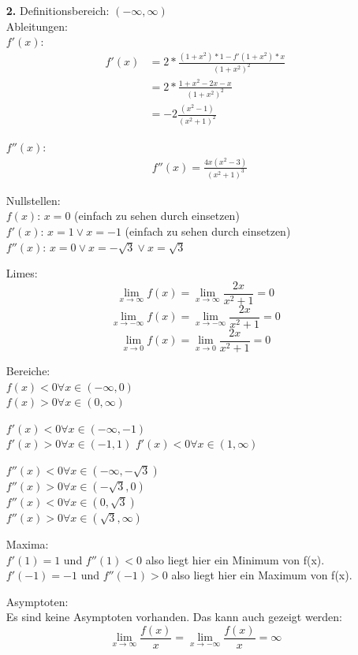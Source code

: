 \documentclass[a4paper]{scrartcl}
\begin{document}
\begin{enumerate}
\item[\textbf{2.}]
Definitionsbereich: \((-\infty,\infty)\)\\
Ableitungen:\\

\(f'(x)\):
\begin{align}
f'(x)&=2*\frac {(1+x^2)*1-f'(1+x^2)*x} {(1+x^2)^2}\\
&=2*\frac {1+x^2-2x-x} {(1+x^2)^2}\\
&=-2\frac {(x^2-1)} {(x^2+1)^2}
\end{align}

\(f''(x)\):
\begin{align}
&f''(x)=\frac {4x(x^2-3)} {(x^2+1)^3}
\end{align}

Nullstellen:\\
\(f(x)\): \(x = 0\) (einfach zu sehen durch einsetzen)\\
\(f'(x)\): \(x = 1 \vee x = -1\) (einfach zu sehen durch einsetzen)\\
\(f''(x)\): \(x = 0 \vee x = -\sqrt 3 \vee x = \sqrt 3\)

Limes:\\
\[\lim_{x \to \infty} f(x) = \lim_{x \to \infty} \frac {2x} {x^2+1} = 0\]
\[\lim_{x \to -\infty} f(x) = \lim_{x \to -\infty} \frac {2x} {x^2+1} = 0\]
\[\lim_{x \to 0} f(x) = \lim_{x \to 0} \frac {2x} {x^2+1} = 0\]

Bereiche:\\
\(f(x) < 0 \forall x \in (-\infty,0)\)\\
\(f(x) > 0 \forall x \in (0,\infty)\)

\(f'(x) < 0 \forall x \in (-\infty,-1)\)\\
\(f'(x) > 0 \forall x \in (-1,1)\)
\(f'(x) < 0 \forall x \in (1,\infty)\)


\(f''(x) < 0 \forall x \in (-\infty,-\sqrt 3)\)\\
\(f''(x) > 0 \forall x \in (-\sqrt 3,0)\)\\
\(f''(x) < 0 \forall x \in (0, \sqrt 3)\)\\
\(f''(x) > 0 \forall x \in (\sqrt 3, \infty)\)

Maxima:\\
\(f'(1) = 1\) und \(f''(1) < 0\) also liegt hier ein Minimum von f(x).\\
\(f'(-1) = -1\) und \(f''(-1) > 0\) also liegt hier ein Maximum von f(x).

Asymptoten:\\
Es sind keine Asymptoten vorhanden. Das kann auch gezeigt werden:
\[\lim_{x \to \infty} \frac {f(x)} x = \lim_{x \to -\infty} \frac {f(x)} x = \infty\]


\end{enumerate}
\end{document}
